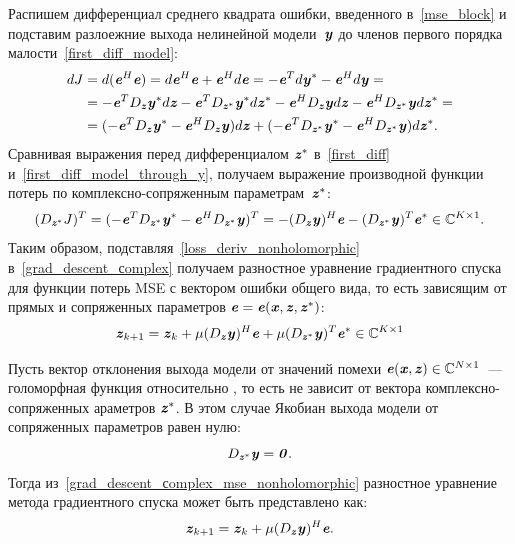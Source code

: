 Распишем дифференциал среднего квадрата ошибки, введенного в~\eqref{mse_block} и подставим разлоежние выхода нелинейной модели~$\textbf{\textit{y}}$ до членов первого порядка малости~\eqref{first_diff_model}:
\begin{align}
	dJ&=d(\textbf{\textit{e}}^H\textbf{\textit{e}})=d\textbf{\textit{e}}^H\textbf{\textit{e}}+\textbf{\textit{e}}^Hd\textbf{\textit{e}}=-\textbf{\textit{e}}^Td\textbf{\textit{y}}^*-\textbf{\textit{e}}^Hd\textbf{\textit{y}}= \nonumber\\
	&=-\textbf{\textit{e}}^TD_{\textbf{\textit{z}}}\textbf{\textit{y}}^*d\textbf{\textit{z}}-\textbf{\textit{e}}^TD_{\textbf{\textit{z}}^*}\textbf{\textit{y}}^*d\textbf{\textit{z}}^*-\textbf{\textit{e}}^HD_{\textbf{\textit{z}}}\textbf{\textit{y}}d\textbf{\textit{z}}-\textbf{\textit{e}}^HD_{\textbf{\textit{z}}^*}\textbf{\textit{y}}d\textbf{\textit{z}}^*= \nonumber \\
	&=(-\textbf{\textit{e}}^TD_{\textbf{\textit{z}}}\textbf{\textit{y}}^*-\textbf{\textit{e}}^HD_{\textbf{\textit{z}}}\textbf{\textit{y}})d\textbf{\textit{z}}+(-\textbf{\textit{e}}^TD_{\textbf{\textit{z}}^*}\textbf{\textit{y}}^*-\textbf{\textit{e}}^HD_{\textbf{\textit{z}}^*}\textbf{\textit{y}})d\textbf{\textit{z}}^*.
	\label{first_diff_model_through_y}
\end{align}
Сравнивая выражения перед дифференциалом $\textbf{\textit{z}}^*$ в~\eqref{first_diff} и~\eqref{first_diff_model_through_y}, получаем выражение производной функции потерь по комплексно-сопряженным параметрам~$\textbf{\textit{z}}^*$:
\begin{equation}
	(D_{\textbf{\textit{z}}^*}J)^T=(-\textbf{\textit{e}}^TD_{\textbf{\textit{z}}^*}\textbf{\textit{y}}^*-\textbf{\textit{e}}^HD_{\textbf{\textit{z}}^*}\textbf{\textit{y}})^T=-(D_{\textbf{\textit{z}}}\textbf{\textit{y}})^H\textbf{\textit{e}}-(D_{\textbf{\textit{z}}^*}\textbf{\textit{y}})^T\textbf{\textit{e}}^*\in\mathbb{C}^{K\times 1}.
	\label{loss_deriv_nonholomorphic}
\end{equation}
Таким образом, подставляя~\eqref{loss_deriv_nonholomorphic} в~\eqref{grad_descent_сomplex} получаем разностное уравнение градиентного спуска для функции потерь MSE с вектором ошибки общего вида, то есть зависящим от прямых и сопряженных параметров $\textbf{\textit{e}}=\textbf{\textit{e}}(\textbf{\textit{x}}, \textbf{\textit{z}}, \textbf{\textit{z}}^*)$:
\begin{equation}
	\textbf{\textit{z}}_{k+1}=\textbf{\textit{z}}_{k}+\mu (D_{\textbf{\textit{z}}}\textbf{\textit{y}})^H\textbf{\textit{e}}+\mu(D_{\textbf{\textit{z}}^*}\textbf{\textit{y}})^T\textbf{\textit{e}}^*\in\mathbb{C}^{K\times1}
	\label{grad_descent_сomplex_mse_nonholomorphic}
\end{equation}

Пусть вектор отклонения выхода модели от значений помехи $\textbf{\textit{e}}(\textbf{\textit{x}}, \textbf{\textit{z}})\in\mathbb{C}^{N\times 1}$~--- голоморфная функция относительно , то есть не зависит от вектора комплексно-сопряженных араметров $\textbf{\textit{z}}^*$. В этом случае Якобиан выхода модели от сопряженных параметров равен нулю:
\begin{equation}
	D_{\textbf{\textit{z}}^*}\textbf{\textit{y}}=\textbf{\textit{0}}.
	\label{condition_holomorphic}
\end{equation}
Тогда из~\eqref{grad_descent_сomplex_mse_nonholomorphic} разностное уравнение метода градиентного спуска может быть представлено как:
\begin{equation}
	\textbf{\textit{z}}_{k+1}=\textbf{\textit{z}}_k+\mu(D_{\textbf{\textit{z}}}\textbf{\textit{y}})^H\textbf{\textit{e}}.
	\label{grad_descent_сomplex_mse_holomorphic}
\end{equation}

